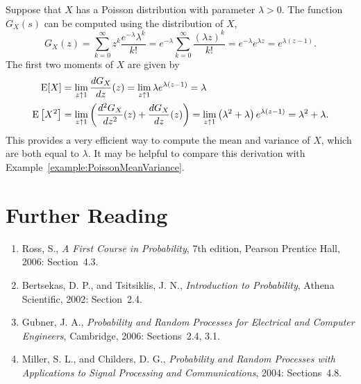 \begin{example}
Suppose that $X$ has a Poisson distribution with parameter $\lambda > 0$.
The function $G_X(s)$ can be computed using the distribution of $X$,
\begin{equation*}
G_X(z) = \sum_{k = 0}^\infty z^{k} \frac{e^{-\lambda}\lambda^k}{k!}
= e^{-\lambda} \sum_{k = 0}^\infty \frac{(\lambda z)^k}{k!}
= e^{-\lambda} e^{\lambda z} = e^{\lambda(z - 1)} .
\end{equation*}
The first two moments of $X$ are given by
\begin{align*}
\mathrm{E} [X] &= \lim_{z \uparrow 1} \frac{d G_X}{dz} (z)
= \lim_{z \uparrow 1} \lambda e^{\lambda(z - 1)} = \lambda \\
\mathrm{E} \left[ X^2 \right] &= \lim_{z \uparrow 1}
\left( \frac{d^2 G_X}{dz^2} (z) + \frac{d G_X}{dz} (z) \right)
= \lim_{z \uparrow 1} \left( \lambda^2 + \lambda \right)
e^{\lambda (z - 1)} = \lambda^2 + \lambda .
\end{align*}
This provides a very efficient way to compute the mean and variance of $X$, which are both equal to $\lambda$.
It may be helpful to compare this derivation with Example~\ref{example:PoissonMeanVariance}.
\end{example}
\fi

\section*{Further Reading}

\begin{small}
\begin{enumerate}
\item Ross, S., \emph{A First Course in Probability}, 7th edition, Pearson Prentice Hall, 2006: Section~4.3.
\item Bertsekas, D. P., and Tsitsiklis, J. N., \emph{Introduction to Probability}, Athena Scientific, 2002: Section~2.4.
\item Gubner, J. A., \emph{Probability and Random Processes for Electrical and Computer Engineers}, Cambridge, 2006: Sections~2.4, 3.1.
\item Miller, S. L., and Childers, D. G., \emph{Probability and Random Processes with Applications to Signal Processing and Communications}, 2004: Sections~4.8.
\end{enumerate}
\end{small}

